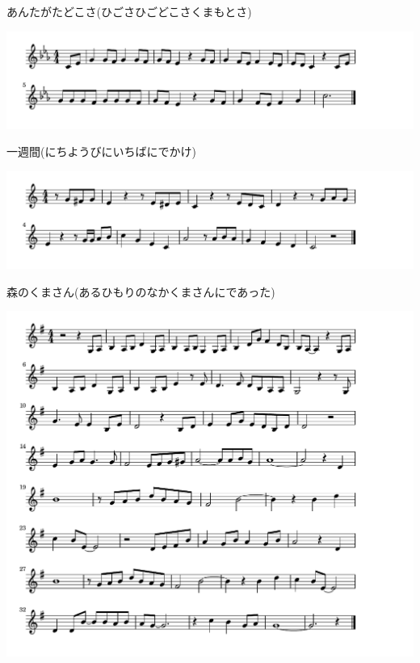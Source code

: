 \documentclass[a4paper]{ltjsarticle}
\begin{document}
\vspace{-10mm} \hspace{10mm}
あんたがたどこさ(ひごさひごどこさくまもとさ)

\includegraphics[clip]{isshukan_crop.pdf}

\vspace{-10mm} \hspace{10mm}
一週間(にちようびにいちばにでかけ)

\includegraphics[clip]{morinokuma_crop.pdf}

\vspace{-10mm} \hspace{10mm}
森のくまさん(あるひもりのなかくまさんにであった)

\includegraphics[clip]{kawanonagare_crop.pdf}
\end{document}
